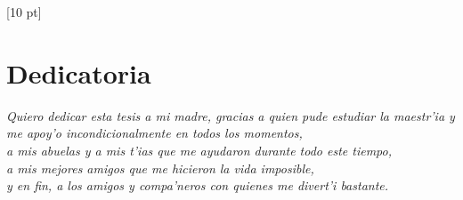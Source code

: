 \titleformat{\chapter}{\Huge\bfseries}{\thechapter}{0 pt}{\rule{340 pt}{3 pt}\\}
\titlespacing{\chapter}{100 pt}{-25 pt}{40 pt}[10 pt]	
\pagestyle{fancy}
\fancyhead[RO,RE]{\thepage}
\fancyfoot[CO,CE]{}

\chapter*{Dedicatoria}

\vspace{140 pt}

\normalsize
\begin{flushright}
\textit{Quiero dedicar esta tesis a mi madre, gracias a quien pude estudiar la maestr'ia y me apoy'o incondicionalmente en todos los momentos,\\ a mis abuelas y a mis t'ias que me ayudaron durante todo este tiempo,\\ a mis mejores amigos que me hicieron la vida imposible,\\ y en fin, a los amigos y compa'neros con quienes me divert'i bastante.}
\end{flushright}
\clearpage